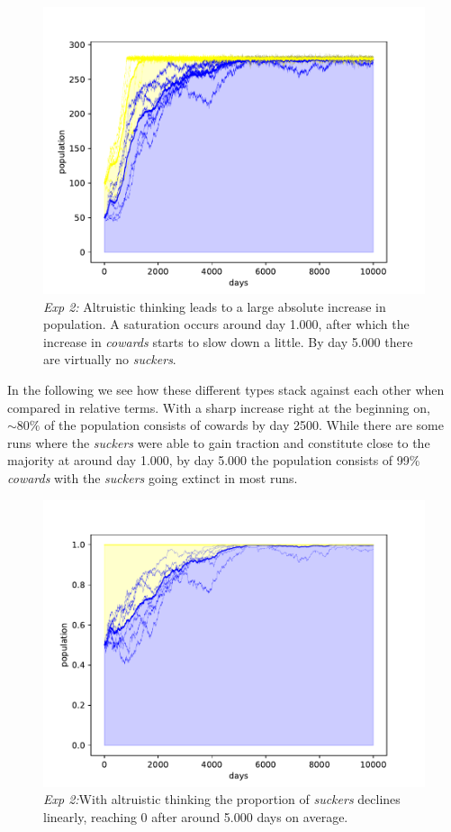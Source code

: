 \documentclass[sigconf]{acmart}
\newcommand{\cowards}{\textit{cowards}\xspace}
\newcommand{\suckers}{\textit{suckers}\xspace}
\begin{document}
    \begin{figure}
        \includegraphics[width=\columnwidth]{figures/exp2_sucker}
        \caption{\textit{Exp 2:} Altruistic thinking leads to a large absolute increase in population.
        A saturation occurs around day 1.000, after which the increase in \cowards starts to slow down a little.
        By day 5.000 there are virtually no \suckers.}
        \label{fig:alt_cow_separated}
    \end{figure}

    In the following  we see how these different types stack against each other when compared in relative terms.
    With a sharp increase right at the beginning on, $\sim 80\%$ of the population consists of cowards by day 2500.
    While there are some runs where the \suckers were able to gain traction and constitute close to the majority at around day 1.000, by day 5.000 the population consists of 99\% \cowards with the \suckers going extinct in most runs.


    \begin{figure}
        \includegraphics[width=\columnwidth]{figures/exp2_sucker_rel}
        \caption{\textit{Exp 2:}With altruistic thinking the proportion of \suckers declines linearly, reaching 0 after around 5.000 days on average.}
        \label{fig:alt_cow_separated_rel}
    \end{figure}
\end{document}
